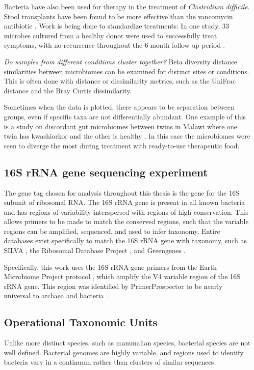 Bacteria have also been used for therapy in the treatment of \textit{Clostridium difficile}. Stool transplants have been found to be more effective than the vancomycin antibiotic \cite{van2013duodenal}. Work is being done to standardize treatments: In one study, 33 microbes cultured from a healthy donor were used to successfully treat symptoms, with no recurrence throughout the 6 month follow up period \cite{petrof2013stool}.

\textit{Do samples from different conditions cluster together?}
Beta diversity distance similarities between microbiomes can be examined for distinct sites or conditions. This is often done with distance or dissimilarity metrics, such as the UniFrac distance and the Bray Curtis dissimilarity.

Sometimes when the data is plotted, there appears to be separation between groups, even if specific taxa are not differentially abundant. One example of this is a study on discordant gut microbiomes between twins in Malawi where one twin has kwashiorkor and the other is healthy \cite{smith2013gut}. In this case the microbiomes were seen to diverge the most during treatment with ready-to-use therapeutic food.

\subsection{16S rRNA gene sequencing experiment}
The gene tag chosen for analysis throughout this thesis is the gene for the 16S subunit of ribosomal RNA. The 16S rRNA gene is present in all known bacteria and has regions of variability interspersed with regions of high conservation. This allows primers to be made to match the conserved regions, such that the variable regions can be amplified, sequenced, and used to infer taxonomy. Entire databases exist specifically to match the 16S rRNA gene with taxonomy, such as SILVA \cite{quast2013silva}, the Ribosomal Database Project \cite{cole2009ribosomal}, and Greengenes \cite{desantis2006greengenes}.

Specifically, this work uses the 16S rRNA gene primers from the Earth Microbiome Project protocol \cite{gilbert2014earth}, which amplify the V4 variable region of the 16S rRNA gene. This region was identified by PrimerProspector to be nearly universal to archaea and bacteria \cite{walters2011primerprospector}.

\subsection{Operational Taxonomic Units}
Unlike more distinct species, such as mammalian species, bacterial species are not well defined. Bacterial genomes are highly variable, and regions used to identify bacteria vary in a continuum rather than clusters of similar sequences.

